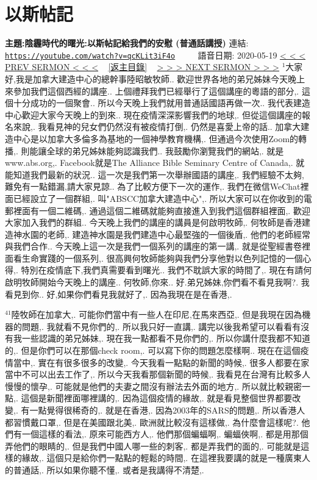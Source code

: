 \documentclass{book}
\begin{document}
\section{以斯帖記}
\label{sec:qcKLit3iF4o}
\textbf{主題:陰霾時代的曙光:以斯帖記給我們的安慰 (普通話講授)}
\newline
\newline
連結: \href{https://youtube.com/watch?v=qcKLit3iF4o}{\texttt{https://youtube.com/watch?v=qcKLit3iF4o}} ~~~~ 語音日期: 2020-05-19
\newline
\newline
\hyperref[sec:9pqygotXAuo]{\small{< < < PREV SERMON < < <}}
~
\hyperref[sec:index]{\small{[返主目錄]}}
~
\hyperref[sec:fFkCm0QGBPw]{\small{> > > NEXT SERMON > > >}}
\newline
\newline
$^{1}$大家好,我是加拿大建造中心的總幹事陸昭敏牧師..
歡迎世界各地的弟兄姊妹今天晚上來參加我們這個西經的講座..
上個禮拜我們已經舉行了這個講座的粵語的部分,.
這個十分成功的一個聚會..
所以今天晚上我們就用普通話國語再做一次..
我代表建造中心歡迎大家今天晚上的到來..
現在疫情深深影響我們的地球,.
但從這個講座的報名來說,.
我看見神的兒女們仍然沒有被疫情打倒,.
仍然是喜愛上帝的話..
加拿大建造中心是以加拿大多倫多為基地的一個神學教育機構,.
但通過今次使用Zoom的轉播,.
則能讓全球的弟兄姊妹能夠認識我們..
我鼓勵你瀏覽我們的網站,.
就是www.abs.org,.
Facebook就是The Alliance Bible Seminary Centre of Canada,.
就能知道我們最新的狀況..
這一次是我們第一次舉辦國語的講座,.
我們經驗不太夠,難免有一點錯漏,請大家見諒..
為了比較方便下一次的運作,.
我們在微信WeChat裡面已經設立了一個群組,.
叫"ABSCC加拿大建造中心",.
所以大家可以在你收到的電郵裡面有一個二維碼,.
通過這個二維碼就能夠直接進入到我們這個群組裡面,.
歡迎大家加入我們的群組..
今天晚上我們的講座的講員是何啟明牧師,.
何牧師是香港建造神水園的老師,.
建造神水園是我們建造中心最堅強的一個後盾,.
他們的老師經常與我們合作..
今天晚上這一次是我們一個系列的講座的第一講,.
就是從聖經書卷裡面看生命實踐的一個系列,.
很高興何牧師能夠與我們分享他對以色列記憶的一個心得,.
特別在疫情底下,我們真需要看到曙光..
我們不耽誤大家的時間了,.
現在有請何啟明牧師開始今天晚上的講座..
何牧師,你來..
好.弟兄姊妹,你們看不看見我啊?.
我看見到你..
好,如果你們看見我就好了,.
因為我現在是在香港,.

$^{41}$陸牧師在加拿大,.
可能你們當中有一些人在印尼,在馬來西亞,.
但是我現在因為機器的問題,.
我就看不見你們的,.
所以我只好一直講,.
講完以後我希望可以看看有沒有我一些認識的弟兄姊妹,.
現在我一點都看不見你們的,.
所以你講什麼我都不知道的,.
但是你們可以在那個check room,.
可以寫下你的問題怎麼樣啊..
現在在這個疫情當中,.
實在有很多很多的改變,.
今天我看一點點的新聞的時候,.
很多人都要在家當中不可以出去工作了,.
所以今天我看那個新聞的時候,.
我看見在台灣有比較多人慢慢的懷孕,.
可能就是他們的夫妻之間沒有辦法去外面的地方,.
所以就比較親密一點,.
這個是新聞裡面哪裡講的,.
因為這個疫情的緣故,.
就是看見整個世界都要改變,.
有一點覺得很稀奇的,.
就是在香港,.
因為2003年的SARS的問題,.
所以香港人都習慣戴口罩,.
但是在美國跟北美,.
歐洲就比較沒有這樣做,.
為什麼會這樣呢?.
他們有一個這樣的看法,.
原來可能西方人,.
他們那個蝙蝠啊,.
蝙蝠俠啊,.
都是用那個弄他們的眼睛的,.
但是我們中國人哪一些的刺客,.
都是弄我們的面的,.
可能就是這樣的緣故,.
這個只是給你們一點點的輕鬆的時間,.
在這裡我要講的就是一種廣東人的普通話,.
所以如果你聽不懂,.
或者是我講得不清楚,.
\end{document}
